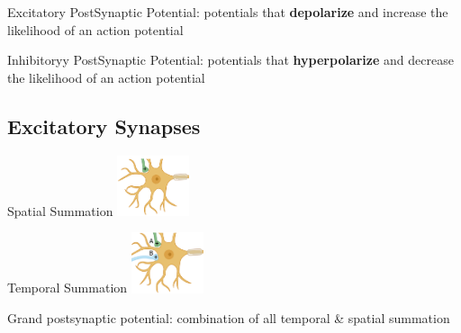 \documentclass[11pt,fleqn]{book} %
\begin{document}
\begin{descriptions}
    \item[Excitatory PostSynaptic Potential:] potentials that \textbf{depolarize} and increase the likelihood of an action potential
    \item[Inhibitoryy PostSynaptic Potential:] potentials that \textbf{hyperpolarize} and decrease the likelihood of an action potential
\end{descriptions}

\subsection{Excitatory Synapses}
\begin{descriptions}
    \item[Spatial Summation] \includegraphics[width=60pt]{Pictures/Screenshot 2024-03-06 175455.png} 
    \item[Temporal Summation] \includegraphics[width=60pt]{Pictures/Screenshot 2024-03-06 175510.png} 
    \item[Grand postsynaptic potential:] combination of all temporal \& spatial summation 
\end{descriptions}
\end{document}
